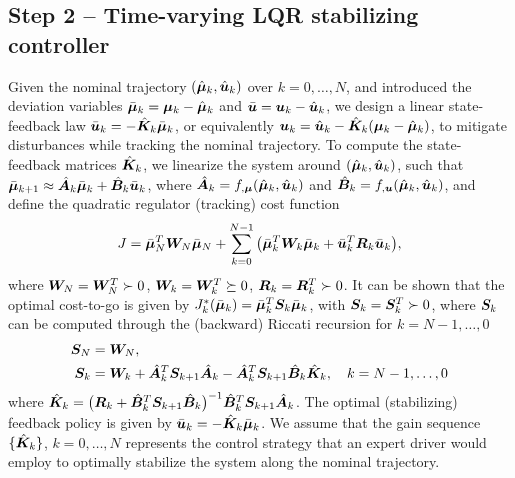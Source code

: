 \subsection{Step 2 -- Time-varying LQR stabilizing controller}
\label{sec:LQR}

Given the nominal trajectory $(\hbmu_k, \hbu_k)$ over $k=0,\ldots, N$, and introduced the deviation variables $\bbmu_k=\bmu_k - \hbmu_k$ and $\bbu = \bu_k - \hbu_k$, we design a linear state-feedback law $\bbu_k= -\hbK_k \bbmu_k$, or equivalently $\bu_k = \hbu_k - \hbK_k (\bmu_k - \hbmu_k)$, to mitigate disturbances while tracking the nominal trajectory. To compute the state-feedback matrices $\hbK_k$, we linearize the system around $(\hbmu_k, \hbu_k)$, such that $\bbmu_{k+1} \approx \hbA_{k}\bbmu_k + \hbB_k \bbu_k$, where $\hbA_k = f_{,\bmu}(\hbmu_k,\hbu_k)$ and $\hbB_k = f_{,\bu}(\hbmu_k,\hbu_k)$, and define the quadratic regulator (tracking) cost function
\begin{align}
J = \bbmu_N^T \bW_N \bbmu_N + \sum_{k=0}^{N-1} \big( \bbmu_k^{T} \bW_k \bbmu_k + \bbu_k^T \bR_k \bbu_k \big),
\end{align}
where $\bW_N=\bW_N^T \succ 0$, $\bW_k=\bW_k^T \succeq 0$, $\bR_k=\bR_k^T \succ 0$. It can be shown that the optimal cost-to-go is given by $J_k^*(\bbmu_k) = \bbmu_k^T \bS_k \bbmu_k$, with $\bS_k = \bS_k^T \succ 0$, where $\bS_k$ can be computed through the (backward) Riccati recursion for $k=N-1,\ldots, 0$
\begin{align}
\bS_N &= \bW_N,\\ 
\bS_{k} &= \bW_k + \hbA_k^T \bS_{k+1} \hbA_k - \hbA_k^T \bS_{k+1}\hbB_k \hbK_k,\quad k={N-1, \ldots, 0}
\end{align}
where  $\hbK_k =\big( \bR_k+\hbB_k^T \bS_{k+1} \hbB_k \big)^{-1} \hbB_k^T \bS_{k+1} \hbA_k$. The optimal (stabilizing) feedback policy is given by $\bbu_k=-\hbK_k \bbmu_k$. We assume that the gain sequence $\{\hbK_k\}$, $k=0,\ldots, N$ represents the control strategy that an expert driver would employ to optimally stabilize the system along the nominal trajectory.

